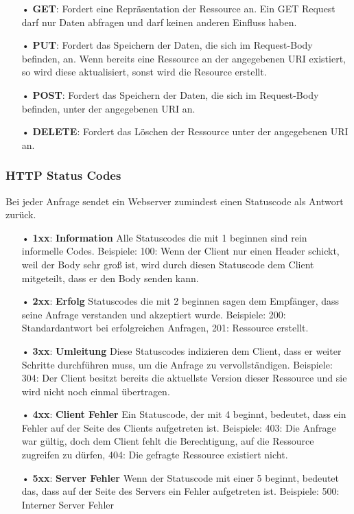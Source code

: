 \begin{itemize}
\item[•] \textbf{GET}: Fordert eine Repräsentation der Ressource an. Ein GET Request darf nur Daten abfragen und darf keinen anderen Einfluss haben.
\item[•] \textbf{PUT}: Fordert das Speichern der Daten, die sich im Request-Body befinden, an. Wenn bereits eine Ressource an der angegebenen \ac{URI} existiert, so wird diese aktualisiert, sonst wird die Resource erstellt.
\item[•] \textbf{POST}: Fordert das Speichern der Daten, die sich im Request-Body befinden, unter der angegebenen \ac{URI} an. 
\item[•] \textbf{DELETE}: Fordert das Löschen der Ressource unter der angegebenen \ac{URI} an.
\end{itemize}

\subsubsection{HTTP Status Codes}
\label{sec:http-status-codes}

Bei jeder Anfrage sendet ein Webserver zumindest einen Statuscode als Antwort zurück.

\begin{itemize}
\item[•] \textbf{1xx}: \textbf{Information} Alle Statuscodes die mit 1 beginnen sind rein informelle Codes. Beispiele: 100: Wenn der Client nur einen Header schickt, weil der Body sehr groß ist, wird durch diesen Statuscode dem Client mitgeteilt, dass er den Body senden kann.
\item[•] \textbf{2xx}: \textbf{Erfolg} Statuscodes die mit 2 beginnen sagen dem Empfänger, dass seine Anfrage verstanden und akzeptiert wurde. Beispiele: 200: Standardantwort bei erfolgreichen Anfragen, 201: Ressource erstellt.
\item[•] \textbf{3xx}: \textbf{Umleitung} Diese Statuscodes indizieren dem Client, dass er weiter Schritte durchführen muss, um die Anfrage zu vervollständigen. Beispiele: 304: Der Client besitzt bereits die aktuellste Version dieser Ressource und sie wird nicht noch einmal übertragen.
\item[•] \textbf{4xx}: \textbf{Client Fehler} Ein Statuscode, der mit 4 beginnt, bedeutet, dass ein Fehler auf der Seite des Clients aufgetreten ist. Beispiele: 403: Die Anfrage war gültig, doch dem Client fehlt die Berechtigung, auf die Ressource zugreifen zu dürfen, 404: Die gefragte Ressource existiert nicht.
\item[•] \textbf{5xx}: \textbf{Server Fehler} Wenn der Statuscode mit einer 5 beginnt, bedeutet das, dass auf der Seite des Servers ein Fehler aufgetreten ist. Beispiele: 500: Interner Server Fehler
\end{itemize}

